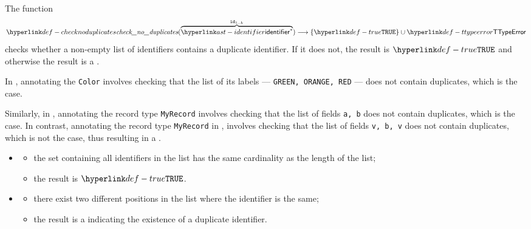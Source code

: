 \FormallyParagraph
{}

\begin{mathpar}
\end{mathpar}

\hypertarget{def-checknoduplicates}{}
The function
\[
  \checknoduplicates(\overname{\identifier^*}{\id_{1..k}}) \aslto \{\True\} \cup \TTypeError
\]
checks whether a non-empty list of identifiers contains a duplicate identifier. If it does not, the result
is $\True$ and otherwise the result is a \typingerrorterm{}.

In , annotating the \enumerationtypeterm{} \verb|Color|
involves checking that the list of its labels --- \verb|GREEN, ORANGE, RED| --- does not contain duplicates,
which is the case.

Similarly, in , annotating the record type \verb|MyRecord|
involves checking that the list of fields \verb|a, b| does not contain duplicates, which is the case.
In contrast, annotating the record type \verb|MyRecord| in ,
involves checking that the list of fields \verb|v, b, v| does not contain duplicates, which is not the case,
thus resulting in a \typingerrorterm.

\ProseParagraph
\OneApplies
\begin{itemize}
  \item {}
  \begin{itemize}
    \item the set containing all identifiers in the list has the same cardinality as the length of the list;
    \item the result is $\True$.
  \end{itemize}

  \item {}
  \begin{itemize}
    \item there exist two different positions in the list where the identifier is the same;
    \item the result is a \typingerrorterm{} indicating the existence of a duplicate identifier.
  \end{itemize}
\end{itemize}

